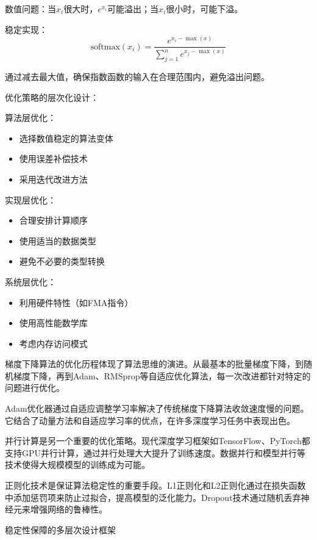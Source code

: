 数值问题：当$x_i$很大时，$e^{x_i}$可能溢出；当$x_i$很小时，可能下溢。

稳定实现：
$$\text{softmax}(x_i) = \frac{e^{x_i - \max(x)}}{\sum_{j=1}^n e^{x_j - \max(x)}}$$

通过减去最大值，确保指数函数的输入在合理范围内，避免溢出问题。

优化策略的层次化设计：

算法层优化：
\begin{itemize}
\item 选择数值稳定的算法变体
\item 使用误差补偿技术
\item 采用迭代改进方法
\end{itemize}

实现层优化：
\begin{itemize}
\item 合理安排计算顺序
\item 使用适当的数据类型
\item 避免不必要的类型转换
\end{itemize}

系统层优化：
\begin{itemize}
\item 利用硬件特性（如FMA指令）
\item 使用高性能数学库
\item 考虑内存访问模式
\end{itemize}

梯度下降算法的优化历程体现了算法思维的演进。从最基本的批量梯度下降，到随机梯度下降，再到Adam、RMSprop等自适应优化算法，每一次改进都针对特定的问题进行优化。

Adam优化器通过自适应调整学习率解决了传统梯度下降算法收敛速度慢的问题。它结合了动量方法和自适应学习率的优点，在许多深度学习任务中表现出色。

并行计算是另一个重要的优化策略。现代深度学习框架如TensorFlow、PyTorch都支持GPU并行计算，通过并行处理大大提升了训练速度。数据并行和模型并行等技术使得大规模模型的训练成为可能。

正则化技术是保证算法稳定性的重要手段。L1正则化和L2正则化通过在损失函数中添加惩罚项来防止过拟合，提高模型的泛化能力。Dropout技术通过随机丢弃神经元来增强网络的鲁棒性。

稳定性保障的多层次设计框架

